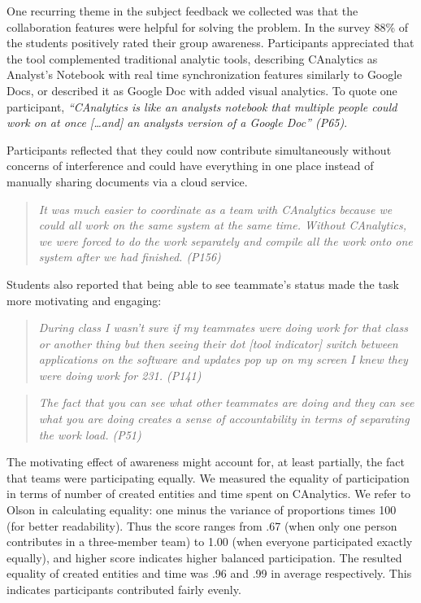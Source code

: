 One recurring theme in the subject feedback we collected was that the
collaboration features were helpful for solving the problem. In the survey
88\% of the students positively rated their
group awareness. Participants appreciated that the tool complemented
traditional analytic tools, describing CAnalytics as Analyst's Notebook with real time
synchronization features similarly to Google Docs, or described it as Google Doc with added visual analytics. To quote one participant,
\emph{``CAnalytics is like an analysts notebook that multiple people
could work on at once {[}\ldots{}and{]} an analysts version of a Google
Doc'' (P65)}.

Participants reflected that they could now contribute simultaneously
without concerns of interference and could
have everything in one place instead of manually sharing documents via a
cloud service.

\begin{quote}
\emph{It was much easier to coordinate as a team with CAnalytics because we
could all work on the same system at the same time. Without CAnalytics,
we were forced to do the work separately and compile all the work onto
one system after we had finished. (P156)}
\end{quote}

Students also reported that being able to see teammate's status made the
task more motivating and engaging:

\begin{quote}
\emph{During class I wasn't sure if my teammates were doing work for that
class or another thing but then seeing their dot {[}tool indicator{]}
switch between applications on the software and updates pop up on my
screen I knew they were doing work for 231. (P141)}
\end{quote}

\begin{quote}
\emph{The fact that you can see what other teammates are doing and they can
see what you are doing creates a sense of accountability in terms of
separating the work load. (P51)}
\end{quote}

The motivating effect of awareness might account for, at least partially,
the fact that teams were participating equally. We measured the equality of
participation in terms of number of created entities and time spent on
CAnalytics. We refer to Olson \cite{Olson2017} in calculating equality: one
minus the variance of proportions times 100 (for better readability). Thus
the score ranges from .67 (when only one person contributes in a three-member
team) to 1.00 (when everyone participated exactly equally), and higher
score indicates higher balanced participation. The resulted equality of
created entities and time was .96 and .99 in average respectively. This
indicates participants contributed fairly evenly.

